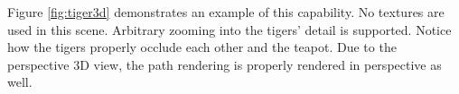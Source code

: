 Figure \ref{fig:tiger3d} demonstrates an example of this capability.
No textures are used in this scene.  Arbitrary zooming into the tigers'
detail is supported.  Notice how the tigers properly occlude each other
and the teapot.  Due to the perspective 3D view, the path rendering is
properly rendered in perspective as well.

